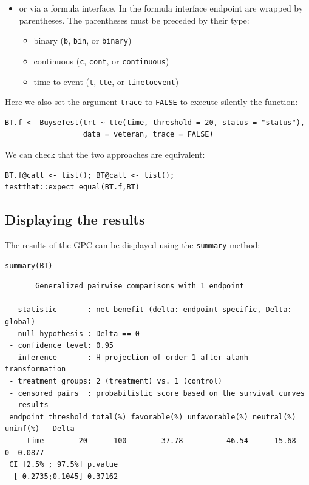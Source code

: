\documentclass[12pt]{article}
\begin{document}
\clearpage

\begin{itemize}
\item or via a formula interface. In the formula interface endpoint are
wrapped by parentheses. The parentheses must be preceded by their
type: 
\begin{itemize}[label={-}]
\item binary (\texttt{b}, \texttt{bin}, or \texttt{binary})
\item continuous (\texttt{c}, \texttt{cont}, or  \texttt{continuous})
\item time to event (\texttt{t}, \texttt{tte}, or \texttt{timetoevent})
\end{itemize}
\end{itemize}
Here we also set the argument \texttt{trace} to \texttt{FALSE} to execute silently
the function:
\lstset{language=r,label= ,caption= ,captionpos=b,numbers=none}
\begin{lstlisting}
BT.f <- BuyseTest(trt ~ tte(time, threshold = 20, status = "status"),
                  data = veteran, trace = FALSE)
\end{lstlisting}

We can check that the two approaches are equivalent:
\lstset{language=r,label= ,caption= ,captionpos=b,numbers=none}
\begin{lstlisting}
BT.f@call <- list(); BT@call <- list();
testthat::expect_equal(BT.f,BT)
\end{lstlisting}

\subsection{Displaying the results}
\label{sec:org6290c6a}

The results of the GPC can be displayed using the \texttt{summary} method:
\lstset{language=r,label= ,caption= ,captionpos=b,numbers=none}
\begin{lstlisting}
summary(BT)
\end{lstlisting}

\begin{verbatim}
       Generalized pairwise comparisons with 1 endpoint

 - statistic       : net benefit (delta: endpoint specific, Delta: global) 
 - null hypothesis : Delta == 0 
 - confidence level: 0.95 
 - inference       : H-projection of order 1 after atanh transformation 
 - treatment groups: 2 (treatment) vs. 1 (control) 
 - censored pairs  : probabilistic score based on the survival curves
 - results
 endpoint threshold total(%) favorable(%) unfavorable(%) neutral(%) uninf(%)   Delta
     time        20      100        37.78          46.54      15.68        0 -0.0877
 CI [2.5% ; 97.5%] p.value 
  [-0.2735;0.1045] 0.37162
\end{verbatim}
\end{document}
